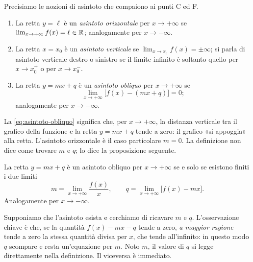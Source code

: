 Precisiamo le nozioni di asintoto che compaiono ai punti C ed F.

\begin{definizione}[Asintoti]\label{def:asintoti}
\begin{enumerate}[label=\textup{(\roman*)}]
  \item La retta $y=\ell$ è un \emph{asintoto orizzontale} per $x\to+\infty$ se
  $\lim_{x\to+\infty}f(x)=\ell\in\mathbb{R}$; analogamente per $x\to-\infty$.
  \item La retta $x=x_{0}$ è un \emph{asintoto verticale} se
  $\lim_{x\to x_{0}}f(x)=\pm\infty$; si parla di asintoto verticale destro o sinistro se
  il limite infinito è soltanto quello per $x\to x_{0}^{+}$ o per $x\to x_{0}^{-}$.
  \item La retta $y=mx+q$ è un \emph{asintoto obliquo} per $x\to+\infty$ se
  \begin{equation}\label{eq:asintoto-obliquo}
    \lim_{x\to+\infty}\bigl[f(x)-(mx+q)\bigr]=0 ;
  \end{equation}
  analogamente per $x\to-\infty$.
\end{enumerate}
\end{definizione}

La \eqref{eq:asintoto-obliquo} significa che, per $x\to+\infty$, la distanza verticale
tra il grafico della funzione e la retta $y=mx+q$ tende a zero: il grafico «si appoggia»
alla retta. L'asintoto orizzontale è il caso particolare $m=0$. La definizione non dice
come trovare $m$ e $q$; lo dice la proposizione seguente.

\begin{proposizione}\label{prop:asintoto-obliquo}
La retta $y=mx+q$ è un asintoto obliquo per $x\to+\infty$ se e solo se esistono finiti
i due limiti
\begin{equation}\label{eq:m-q}
  m=\lim_{x\to+\infty}\frac{f(x)}{x}, \qquad q=\lim_{x\to+\infty}\bigl[f(x)-mx\bigr].
\end{equation}
Analogamente per $x\to-\infty$.
\end{proposizione}

\begin{schema}
\end{schema}

\begin{strategia}
Supponiamo che l'asintoto esista e cerchiamo di ricavare $m$ e $q$. L'osservazione chiave
è che, se la quantità $f(x)-mx-q$ tende a zero, \emph{a maggior ragione} tende a zero la
stessa quantità divisa per $x$, che tende all'infinito: in questo modo $q$ scompare e
resta un'equazione per $m$. Noto $m$, il valore di $q$ si legge direttamente nella
definizione. Il viceversa è immediato.
\end{strategia}

